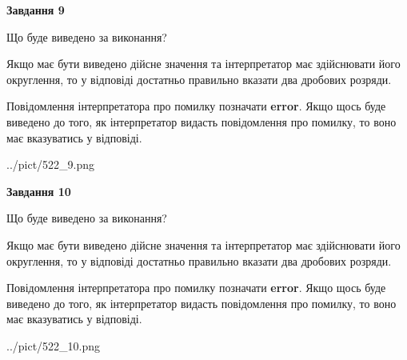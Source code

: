 \documentclass[12pt, ukrainian]{article}
\begin{document}
{\begin {Large}
{\begin {center}\textbf{Завдання 9}\end {center}}\par
Що буде виведено за виконання? \par

Якщо має бути виведено дійсне значення та інтерпретатор має здійснювати його округлення, 
то у відповіді достатньо правильно вказати два дробових розряди.

Повідомлення інтерпретатора про помилку позначати \textbf{error}.
Якщо щось буде виведено до того, як інтерпретатор видасть повідомлення про помилку, 
то воно має вказуватись у відповіді. \par

\begin{center}
	{../pict/522_9.png}
\end{center}
\newpage

{\begin {center}\textbf{Завдання 10}\end {center}}\par
Що буде виведено за виконання? \par

Якщо має бути виведено дійсне значення та інтерпретатор має здійснювати його округлення, 
то у відповіді достатньо правильно вказати два дробових розряди.

Повідомлення інтерпретатора про помилку позначати \textbf{error}.
Якщо щось буде виведено до того, як інтерпретатор видасть повідомлення про помилку, 
то воно має вказуватись у відповіді. \par

\begin{center}
	{../pict/522_10.png}
\end{center}
\newpage

\end {Large}}
\end{document}
